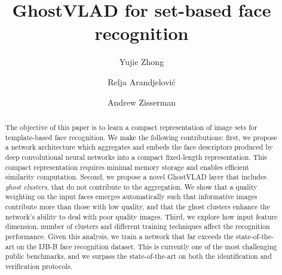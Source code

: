 \documentclass[runningheads]{llncs}
\begin{document}
\title{GhostVLAD for set-based face recognition} 



\author{Yujie Zhong \and
Relja Arandjelovi\'c\and
Andrew Zisserman}










\def\eg{\emph{e.g. }}
\def\Eg{\emph{E.g. }}
\def\etal{\emph{et al. }}
\def\ie{\emph{i.e. }}
\def\etc{\emph{etc. }}

\renewcommand{\paragraph}[1]{\medskip\noindent{\emph{#1}}}

\maketitle

\begin{abstract}

The objective of this paper is to learn a 
compact representation of image sets for
template-based  face recognition.
We make the following 
contributions:
first, we propose a network architecture which 
aggregates and  embeds the face descriptors 
produced by deep convolutional neural networks 
into a compact fixed-length representation.
This compact representation requires minimal memory 
storage and enables  efficient similarity 
computation. 
Second, we propose a novel 
GhostVLAD layer that includes {\em ghost clusters}, that do not contribute to the aggregation.
We show that a quality
weighting on the input faces  emerges automatically
such that informative images 
contribute more than those with low  quality, and 
that  the ghost clusters enhance  the network's  ability to 
deal with poor quality images. 
Third, we explore how input feature dimension,
number of clusters and 
different training techniques affect the recognition
performance. Given this analysis, we train
a network that far exceeds the state-of-the-art
on the IJB-B face recognition dataset. This  is
currently one of the most challenging public benchmarks, and we surpass the state-of-the-art on both
the identification and verification protocols.



\end{abstract}
\end{document}
